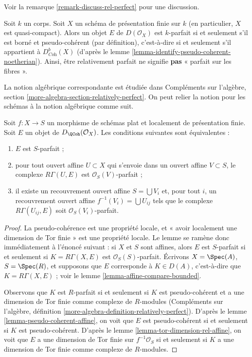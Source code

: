 \noindent
Voir la remarque \ref{remark-discuss-rel-perfect} pour une discussion.

\begin{example}
\label{example-relatively-perfect-field}
Soit $k$ un corps. Soit $X$ un schéma de présentation finie sur $k$
(en particulier, $X$ est quasi-compact). Alors un objet $E$ de $D(\mathcal{O}_X)$
est $k$-parfait si et seulement s'il est borné et pseudo-cohérent
(par définition), c'est-à-dire si et seulement s'il appartient à $D^b_{\textit{Coh}}(X)$
(d'après le lemme \ref{lemma-identify-pseudo-coherent-noetherian}).
Ainsi, être relativement parfait ne signifie {\bf pas} « parfait sur les fibres ».
\end{example}

\noindent
La notion algébrique correspondante est étudiée dans
Compléments sur l'algèbre, section \ref{more-algebra-section-relatively-perfect}.
On peut relier la notion pour les schémas à la notion algébrique
comme suit.

\begin{lemma}
\label{lemma-affine-locally-rel-perfect}
Soit $f : X \to S$ un morphisme de schémas plat et
localement de présentation finie. Soit $E$ un objet de
$D_\QCoh(\mathcal{O}_X)$. Les conditions suivantes sont équivalentes :
\begin{enumerate}
\item $E$ est $S$-parfait ;
\item pour tout ouvert affine $U \subset X$ qui s'envoie dans un ouvert affine
$V \subset S$, le complexe $R\Gamma(U, E)$ est $\mathcal{O}_S(V)$-parfait ;
\item il existe un recouvrement ouvert affine $S = \bigcup V_i$
et, pour tout $i$, un recouvrement ouvert affine $f^{-1}(V_i) = \bigcup U_{ij}$
tels que le complexe $R\Gamma(U_{ij}, E)$ soit $\mathcal{O}_S(V_i)$-parfait.
\end{enumerate}
\end{lemma}

\begin{proof}
La pseudo-cohérence est une propriété locale, et
« avoir localement une dimension de Tor finie » est une propriété locale.
Le lemme se ramène donc immédiatement à l'énoncé suivant :
si $X$ et $S$ sont affines, alors $E$ est $S$-parfait
si et seulement si $K = R\Gamma(X, E)$ est $\mathcal{O}_S(S)$-parfait.
Écrivons $X = \Spec(A)$, $S = \Spec(R)$, et supposons que $E$ corresponde à
$K \in D(A)$, c'est-à-dire que $K = R\Gamma(X, E)$ ; voir le
lemme \ref{lemma-affine-compare-bounded}.

\medskip\noindent
Observons que $K$ est $R$-parfait si et seulement si $K$ est
pseudo-cohérent et a une dimension de Tor finie comme complexe
de $R$-modules (Compléments sur l'algèbre, définition
\ref{more-algebra-definition-relatively-perfect}).
D'après le lemme \ref{lemma-pseudo-coherent-affine},
on voit que $E$ est pseudo-cohérent si et seulement si
$K$ est pseudo-cohérent.
D'après le lemme \ref{lemma-tor-dimension-rel-affine}, on voit que
$E$ a une dimension de Tor finie sur $f^{-1}\mathcal{O}_S$
si et seulement si $K$ a une dimension de Tor finie comme complexe de
$R$-modules.
\end{proof}

